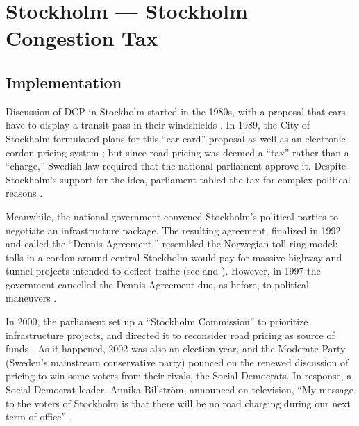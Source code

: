 \section{Stockholm --- Stockholm Congestion Tax}\label{sec:stockholm}

\subsection{Implementation}

Discussion of DCP in Stockholm started in the 1980s, with a proposal that cars have to display a transit pass in their windshields \citep{GullbergIsaksson2009,Arnott2005}. In 1989, the City of Stockholm formulated plans for this ``car card'' proposal as well as an electronic cordon pricing system \citep[p. 90]{Hau1992}; but since road pricing was deemed a ``tax'' rather than a ``charge,'' Swedish law required that the national parliament approve it. Despite Stockholm's support for the idea, parliament tabled the tax for complex political reasons \citep{Ahlstrand2001}. 

Meanwhile, the national government convened Stockholm's political parties to negotiate an infrastructure package. The resulting agreement, finalized in 1992 and called the ``Dennis Agreement,'' resembled the Norwegian toll ring model: tolls in a cordon around central Stockholm would pay for massive highway and tunnel projects intended to deflect traffic  (see \citet[pp. 39-40]{Gomez-Ibanez1994} and \citet[p. 92]{Hau1992}). However, in 1997 the government cancelled the Dennis Agreement due, as before, to political maneuvers \citep{Ahlstrand2001,GullbergIsaksson2009}.

In 2000, the parliament set up a ``Stockholm Commission'' to  prioritize infrastructure projects, and directed it to reconsider road pricing as source of funds \citep{Eliasson2009b}. As it happened, 2002 was also an election year, and the Moderate Party (Sweden's mainstream conservative party) pounced on the renewed discussion of pricing to win some voters from their rivals, the Social Democrats. In response, a Social Democrat leader, Annika Billstr\"om, announced on television, ``My message to the voters of Stockholm is that there will be no road charging during our next term of office'' \citep{GullbergIsaksson2009}.

